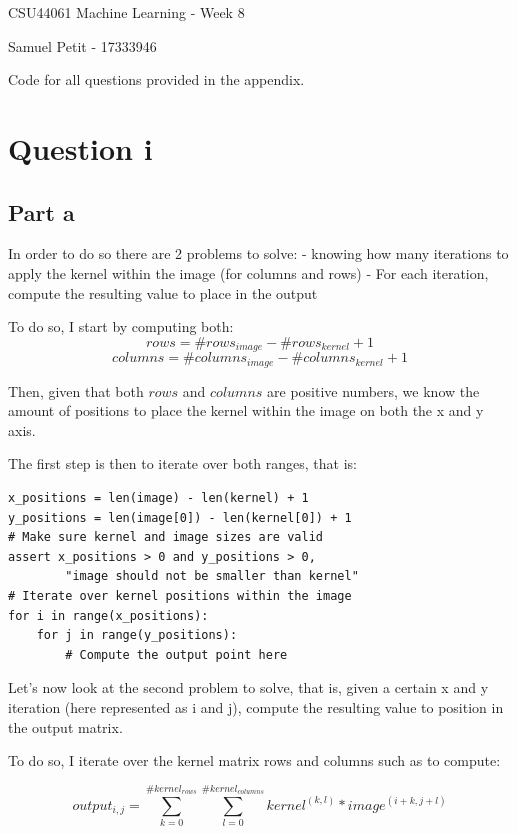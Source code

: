 \documentclass[10pt]{article}
\begin{document}
{\centering
    CSU44061 Machine Learning - Week 8
    \par
    Samuel Petit - 17333946
    \par
    Code for all questions provided in the appendix.
}
\section*{Question i}
\subsection*{Part a}
In order to do so there are 2 problems to solve:
- knowing how many iterations to apply the kernel within the image (for columns and rows)
- For each iteration, compute the resulting value to place in the output

To do so, I start by computing both:
\begin{equation*}
    rows = \# rows_{image} - \# rows_{kernel} + 1
\end{equation*}
\begin{equation*}
    columns = \# columns_{image} - \# columns_{kernel} + 1
\end{equation*}

Then, given that both $rows$ and $columns$ are positive numbers, we know
the amount of positions to place the kernel within the image on both the x and y axis.

The first step is then to iterate over both ranges, that is:
\begin{lstlisting}
x_positions = len(image) - len(kernel) + 1
y_positions = len(image[0]) - len(kernel[0]) + 1
# Make sure kernel and image sizes are valid
assert x_positions > 0 and y_positions > 0, 
        "image should not be smaller than kernel"
# Iterate over kernel positions within the image
for i in range(x_positions):
    for j in range(y_positions):
        # Compute the output point here
\end{lstlisting}

Let's now look at the second problem to solve, that is, given a certain x and y
iteration (here represented as i and j), compute the resulting value to position
in the output matrix.

To do so, I iterate over the kernel matrix rows and columns such as to compute:

\begin{equation*}
    output_{i,j} = \sum_{k = 0}^{\#kernel_{rows}}\sum_{l = 0}^{\#kernel_{columns}} kernel^{(k,l)} * image^{(i + k, j + l)}
\end{equation*}
\end{document}
